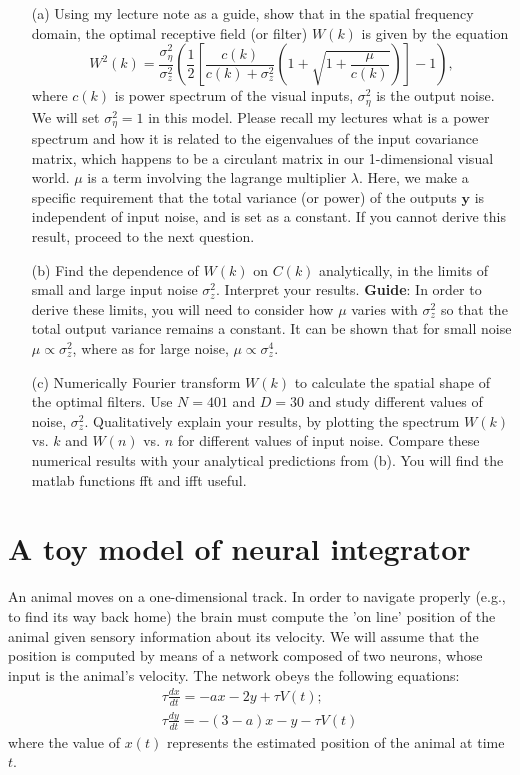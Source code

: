 \documentclass{article}
\begin{document}
\begin{enumerate}
\item[(a)] Using my lecture note as a guide, show that  in the spatial frequency domain, the optimal receptive field (or filter) $W(k)$ is given by the equation
\[
W^2(k) = \frac{\sigma_\eta^2}{\sigma_z^2}\left(\frac{1}{2}\left[\frac{c(k)}{c(k) + \sigma_z^2}\left(1+\sqrt{1+\frac{\mu}{c(k)}}\right)\right] - 1\right),
\]
where $c(k)$ is power spectrum of the visual inputs, $\sigma_\eta^2$ is the output noise. We will set $\sigma_\eta^2 = 1$ in this model. Please recall my lectures what is a power spectrum and how it is related to the eigenvalues of the input covariance matrix, which happens to be a circulant matrix in our 1-dimensional visual world. $\mu$ is a term involving the lagrange multiplier $\lambda$. Here, we make a specific requirement that the total variance (or power) of the outputs $\mathbf{y}$ is independent of input noise, and is set as a constant. If you cannot derive this result, proceed to the next question.

\item[(b)] Find the dependence of $W(k)$ on $C(k)$ analytically, in the limits of small and large input noise $\sigma_z^2$. Interpret your results.  \textbf{Guide}: In order to derive these limits, you will need to consider how $\mu$ varies with $\sigma_z^2$ so that the total output variance remains a constant. It can be shown that for small noise $\mu \propto \sigma_z^2$, where as for large noise,  $\mu \propto \sigma_z^4$.

\item[(c)] Numerically Fourier transform $W(k)$ to calculate the spatial shape of the optimal filters. Use $N=401$ and $D=30$ and study different values of noise, $\sigma_z^2$. Qualitatively explain your results, by plotting the spectrum $W(k)$ vs. $k$ and $W(n)$ vs. $n$ for different values of input noise. Compare these numerical results with your analytical predictions from (b). You will find the matlab functions fft and ifft useful.  
\end{enumerate}


\section*{A toy model of neural integrator}
An animal moves on a one-dimensional track. In order to navigate properly (e.g., to find its way back home) the brain must compute the 'on line' position of the animal given sensory information about its velocity. We will assume that the position is computed by means of a network composed of two neurons, whose input is the animal's velocity. The network obeys the following equations:
\begin{equation}
\begin{aligned}
\tau \frac{dx}{dt}=-ax-2y+\tau V(t); \\
\tau \frac{dy}{dt}=-(3-a)x-y-\tau V(t)
\end{aligned}
\end{equation}
where the value of $x(t)$ represents the estimated position of the animal at time $t$. 
\end{document}
